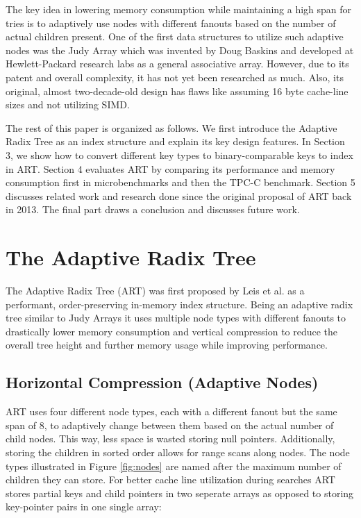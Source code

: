 \documentclass[acmtog, nonacm]{acmart}
\begin{document}
The key idea in lowering memory consumption while maintaining a high span for tries is to adaptively use nodes 
with different fanouts based on the number of actual children present. One of the first data structures to utilize such 
adaptive nodes was the Judy Array \cite{baskins2004judy} which was invented by Doug Baskins and developed at 
Hewlett-Packard research labs as a general associative array. However, due to its patent and overall complexity, 
it has not yet been researched as much. Also, its original, almost two-decade-old design has flaws like assuming 
16 byte cache-line sizes and not utilizing SIMD.

The rest of this paper is organized as follows. We first introduce the Adaptive Radix Tree as an index structure 
and explain its key design features. In Section 3, we show how to convert different key types to binary-comparable keys to 
index in ART. Section 4 evaluates ART by comparing its performance and memory consumption first in 
microbenchmarks and then the TPC-C benchmark. Section 5 discusses related work and research done since the 
original proposal of ART back in 2013. The final part draws a conclusion and discusses future work.

\section{The Adaptive Radix Tree}

The Adaptive Radix Tree (ART) was first proposed by Leis et al. \cite{6544812} as a performant, order-preserving 
in-memory index structure. Being an adaptive radix tree similar to Judy Arrays it uses multiple node types 
with different fanouts to drastically lower memory consumption and vertical compression to reduce the overall tree 
height and further memory usage while improving performance.

\subsection{Horizontal Compression (Adaptive Nodes)}
ART uses four different node types, each with a different fanout but the same span 
of 8, to adaptively change between them based on the actual number of child nodes. This way, less space is wasted 
storing null pointers. Additionally, storing the children in sorted order allows for range scans along nodes. The node types 
illustrated in Figure \ref{fig:nodes} are named after the maximum number of children 
they can store. For better cache line utilization during searches ART stores partial keys and child pointers in two 
seperate arrays as opposed to storing key-pointer pairs in one single array:
\end{document}
